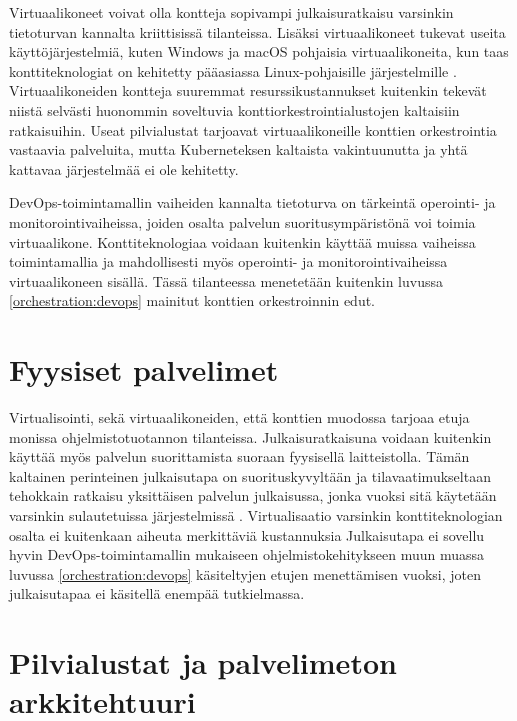 
Virtuaalikoneet voivat olla kontteja sopivampi julkaisuratkaisu varsinkin tietoturvan kannalta kriittisissä tilanteissa.
Lisäksi virtuaalikoneet tukevat useita käyttöjärjestelmiä, kuten Windows ja macOS pohjaisia virtuaalikoneita, kun taas konttiteknologiat on kehitetty pääasiassa Linux-pohjaisille järjestelmille \cite{Watada19}.
Virtuaalikoneiden kontteja suuremmat resurssikustannukset kuitenkin tekevät niistä selvästi huonommin soveltuvia konttiorkestrointialustojen kaltaisiin ratkaisuihin.
Useat pilvialustat tarjoavat virtuaalikoneille konttien orkestrointia vastaavia palveluita, mutta Kuberneteksen kaltaista vakintuunutta ja yhtä kattavaa järjestelmää ei ole kehitetty. %

DevOps-toimintamallin vaiheiden kannalta tietoturva on tärkeintä operointi- ja monitorointivaiheissa, joiden osalta palvelun suoritusympäristönä voi toimia virtuaalikone.
Konttiteknologiaa voidaan kuitenkin käyttää muissa vaiheissa toimintamallia ja mahdollisesti myös operointi- ja monitorointivaiheissa virtuaalikoneen sisällä.
Tässä tilanteessa menetetään kuitenkin luvussa \ref{orchestration:devops} mainitut konttien orkestroinnin edut.

\section{Fyysiset palvelimet}

Virtualisointi, sekä virtuaalikoneiden, että konttien muodossa tarjoaa etuja monissa ohjelmistotuotannon tilanteissa.
Julkaisuratkaisuna voidaan kuitenkin käyttää myös palvelun suorittamista suoraan fyysisellä laitteistolla.
Tämän kaltainen perinteinen julkaisutapa on suorituskyvyltään ja tilavaatimukseltaan tehokkain ratkaisu yksittäisen palvelun julkaisussa, jonka vuoksi sitä käytetään varsinkin sulautetuissa järjestelmissä \cite{Heiser08}.
Virtualisaatio varsinkin konttiteknologian osalta ei kuitenkaan aiheuta merkittäviä kustannuksia \cite{torrez19}
Julkaisutapa ei sovellu hyvin DevOps-toimintamallin mukaiseen ohjelmistokehitykseen muun muassa luvussa \ref{orchestration:devops} käsiteltyjen etujen menettämisen vuoksi, joten julkaisutapaa ei käsitellä enempää tutkielmassa.

\section{Pilvialustat ja palvelimeton arkkitehtuuri}

